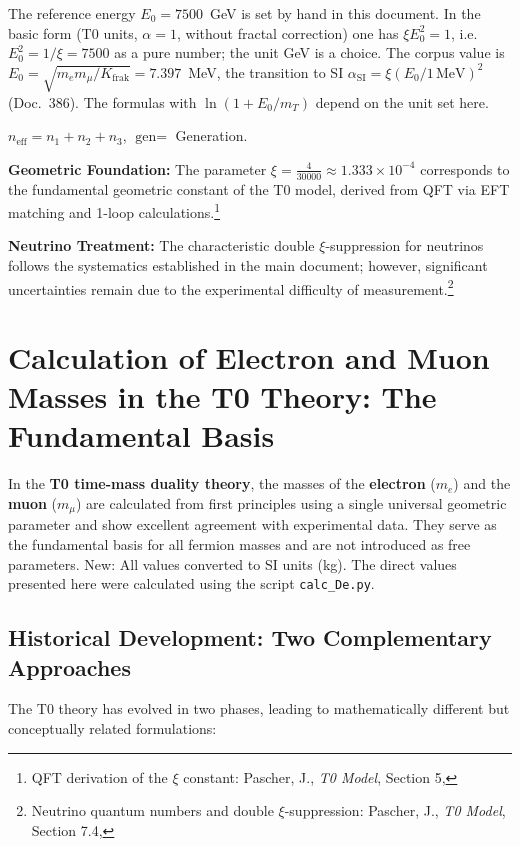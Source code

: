 	The reference energy $E_0 = 7500$~GeV is set by hand in this document. In the basic form (T0 units, $\alpha = 1$, without fractal correction) one has $\xi E_0^2 = 1$, i.e. $E_0^2 = 1/\xi = 7500$ as a pure number; the unit GeV is a choice. The corpus value is $E_0 = \sqrt{m_e m_\mu/K_{\text{frak}}} = 7.397$~MeV, the transition to SI $\alpha_{\text{SI}} = \xi (E_0/1\,\text{MeV})^2$ (Doc.~386). The formulas with $\ln(1 + E_0/m_T)$ depend on the unit set here.
	
	$n_{\text{eff}} = n_1 + n_2 + n_3$, $\text{gen} =$ Generation.
	
	\textbf{Geometric Foundation:} The parameter $\xi = \frac{4}{30000} \approx 1.333 \times 10^{-4}$ corresponds to the fundamental geometric constant of the T0 model, derived from QFT via EFT matching and 1-loop calculations.\footnote{QFT derivation of the $\xi$ constant: Pascher, J., \emph{T0 Model}, Section 5, }
	
	\textbf{Neutrino Treatment:} The characteristic double $\xi$-suppression for neutrinos follows the systematics established in the main document; however, significant uncertainties remain due to the experimental difficulty of measurement.\footnote{Neutrino quantum numbers and double $\xi$-suppression: Pascher, J., \emph{T0 Model}, Section 7.4, }
	
	\section{Calculation of Electron and Muon Masses in the T0 Theory: The Fundamental Basis}
	
	In the \textbf{T0 time-mass duality theory}, the masses of the \textbf{electron} ($m_e$) and the \textbf{muon} ($m_\mu$) are calculated from first principles using a single universal geometric parameter and show excellent agreement with experimental data. They serve as the fundamental basis for all fermion masses and are not introduced as free parameters. New: All values converted to SI units (kg). The direct values presented here were calculated using the script \texttt{calc\_De.py}.
	
	\subsection{Historical Development: Two Complementary Approaches}
	
	The T0 theory has evolved in two phases, leading to mathematically different but conceptually related formulations:
	
